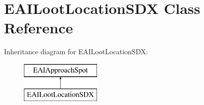 \hypertarget{class_e_a_i_loot_location_s_d_x}{}\section{E\+A\+I\+Loot\+Location\+S\+DX Class Reference}
\label{class_e_a_i_loot_location_s_d_x}
Inheritance diagram for E\+A\+I\+Loot\+Location\+S\+DX\+:\begin{figure}[H]
\begin{center}
\leavevmode
\includegraphics[height=2.000000cm]{class_e_a_i_loot_location_s_d_x}
\end{center}
\end{figure}
